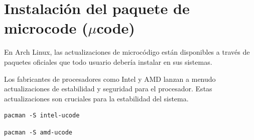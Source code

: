 \section{Instalación del paquete de microcode (\texorpdfstring{$\mu$}{µ}code)}

En Arch Linux, las actualizaciones de microcódigo están disponibles a través de paquetes oficiales que todo usuario debería instalar en sus sistemas.
    
Los fabricantes de procesadores como Intel y AMD lanzan a menudo actualizaciones de estabilidad y seguridad para el procesador. Estas actualizaciones son cruciales para la estabilidad del sistema.\\\vspace{5mm}
    
\begin{tcolorbox}[title=En el caso de Intel]
\begin{lstlisting}[style=bashstyle]
pacman -S intel-ucode
\end{lstlisting}
\end{tcolorbox}

\begin{tcolorbox}[title=En el caso de AMD]
\begin{lstlisting}[style=bashstyle]
pacman -S amd-ucode
\end{lstlisting}
\end{tcolorbox}
\newpage
